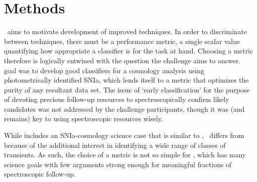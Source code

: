 \section{Methods}
\label{sec:methods}


\plasticc\ aims to motivate development of improved techniques. In order to discriminate between techniques, there must be a performance metric, a single scalar value quantifying how appropriate a classifier is for the task at hand. Choosing a metric therefore is logically entwined with the question the challenge aims to answer.
\snphotcc goal was to develop good classifiers for a cosmology analysis using photometrically identified SNIa, which lends itself to a metric that optimizes the purity of any resultant data set. The issue of `early classification' for the purpose of devoting precious follow-up resources to spectroscopically confirm likely candidates was not addressed by the challenge participants, though it was (and remains) key to using spectroscopic resources wisely. 

While \plasticc includes an SNIa-cosmology science case that is similar to \snphotcc, \plasticc\ differs from \snphotcc because of the additional interest in identifying a wide range of classes of transients. As such, the choice of a metric is not so simple for \plasticc, which has many science goals with few arguments strong enough for meaningful fractions of spectroscopic follow-up.

